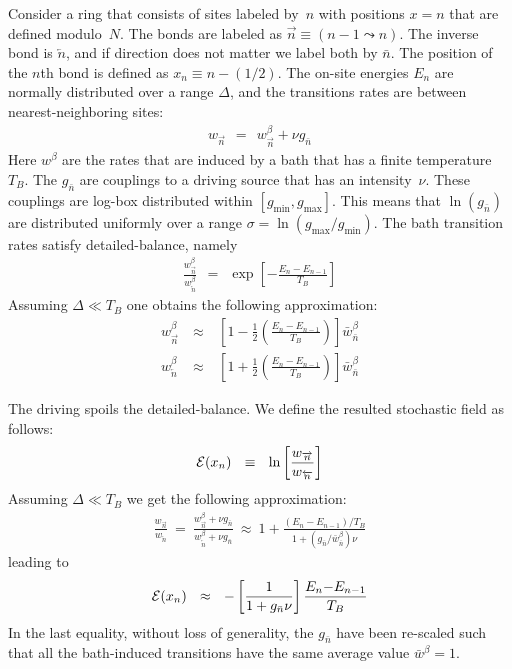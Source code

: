 \documentclass[aps,pre,floats,floatfix,twocolumn]{revtex4}
\newcommand{\mylabel}[1]{\label{#1}}
\newcommand{\beq}{\begin{eqnarray}}
\newcommand{\eeq}{\end{eqnarray}}
\newcommand{\be}[1]{\begin{eqnarray}\ifthenelse{#1=-1}
{\nonumber}{\ifthenelse{#1=0}{}{\mylabel{e#1}}}}
\begin{document}
Consider a ring that consists of sites labeled by~$n$ 
with positions ${x=n}$ that are defined modulo~$N$. 
The bonds are labeled as ${\overrightarrow{n}\equiv(n{-}1 \leadsto n)}$.
The inverse bond is $\overleftarrow{n}$, and if direction does 
not matter we label both by $\bar{n}$. The position of the $n$th bond 
is defined as $x_n \equiv n{-}(1/2)$. The on-site energies $E_n$ 
are normally distributed over a range $\Delta$,  
and the transitions rates are between nearest-neighboring sites:   
%
\beq
w_{\overrightarrow{n}} \ \ = \ \ w^{\beta}_{\overrightarrow{n}} + \nu g_{\bar{n}}
\eeq 
%
Here $w^{\beta}$ are the rates that are induced by a bath that has 
a finite temperature $T_B$. The $g_{\bar{n}}$ are 
couplings to a driving source that has an intensity~$\nu$. 
These couplings are log-box distributed within ${[g_{\text{min}},g_{\text{max}}]}$.
This means that $\ln(g_{\bar{n}})$ are distributed uniformly 
over a range ${\sigma=\ln(g_{\text{max}}/g_{\text{min}})}$. 
%
%
The bath transition rates satisfy detailed-balance, namely 
%
\beq
\frac{w^{\beta}_{\overrightarrow{n}}}{w^{\beta}_{\overleftarrow{n}}} 
\ \  = \ \ \exp\left[-\frac{E_{n}{-}E_{n{-}1}}{T_B}\right]
\eeq
%
Assuming ${\Delta \ll T_B}$ one obtains the following approximation: 
%
\beq
w^{\beta}_{\overrightarrow{n}} \ &\approx& \ \left[1-\frac{1}{2}\left(\frac{E_n-E_{n{-}1}}{T_B}\right)\right]\bar{w}_{\bar{n}}^{\beta} \\ 
w^{\beta}_{\overleftarrow{n}} \ &\approx& \ \left[1+\frac{1}{2}\left(\frac{E_n-E_{n{-}1}}{T_B}\right)\right]\bar{w}_{\bar{n}}^{\beta}
\eeq  



The driving spoils the detailed-balance. 
We define the resulted stochastic field as follows:
%
\be{100} 
\mathcal{E}(x_n) \ \ \equiv \ \ \ln \left[\frac{w_{\overrightarrow{n}}}{w_{\overleftarrow{n}}}\right] 
\eeq
%
Assuming  ${\Delta \ll T_B}$ we get the following approximation: 
%
\beq
\frac{w_{\overrightarrow{n}}}{w_{\overleftarrow{n}}} 
\ = \ \frac{w^{\beta}_{\overrightarrow{n}}+\nu g_{\bar{n}}}{w^{\beta}_{\overleftarrow{n}}+\nu g_{\bar{n}}}
\ \approx \ 1+ \frac{(E_n-E_{n{-}1})/T_B}{1+(g_{\bar{n}}/\bar{w}_{\bar{n}}^{\beta})\nu}
\eeq
%
leading to 
%
\be{101}
\mathcal{E}(x_n) \ \ \approx \ \ - \left[ \frac{1}{1+g_{\bar{n}}\nu} \right] \frac{E_n{-}E_{n{-}1}}{T_B}
\eeq
%
In the last equality, without loss of generality,  
the $g_{\bar{n}}$ have been re-scaled such that 
all the bath-induced transitions 
have the same average value ${\bar{w}^{\beta}=1}$.
\end{document}
